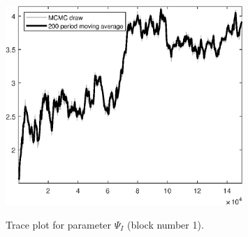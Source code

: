 \begin{figure}[H]
\centering
  \includegraphics[width=0.8\textwidth]{BRS_sectoral_KK/graphs/TracePlot_Psi_I_blck_1}\\
    \caption{Trace plot for parameter ${\Psi_I}$ (block number 1).}
\end{figure}

